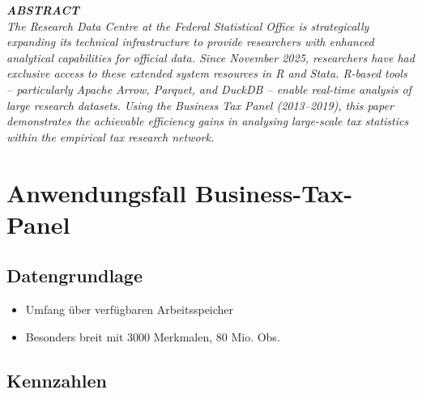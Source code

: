 \documentclass[
  german,
  10pt,
  twoside]{article}
\providecommand{\tightlist}{%
  \setlength{\itemsep}{0pt}\setlength{\parskip}{0pt}}
\renewcommand*\contentsname{Inhaltsverzeichnis}
\newcommand\contentsname{Inhaltsverzeichnis}
\begin{document}
\begin{titlepage}
\begin{minipage}[t]{11.8cm}
\vspace{0.3cm}

{\itshape\color{wistaDarkGray}\bfseries\MakeUppercase{Abstract}}\\[0.15cm]
\small\itshape
The Research Data Centre at the Federal Statistical Office is strategically expanding its technical infrastructure to provide researchers with enhanced analytical capabilities for official data. Since November 2025, researchers have had exclusive access to these extended system resources in R and Stata. R-based tools -- particularly Apache Arrow, Parquet, and DuckDB -- enable real-time analysis of large research datasets. Using the Business Tax Panel (2013--2019), this paper demonstrates the achievable efficiency gains in analysing large-scale tax statistics within the empirical tax research network.

\end{minipage}

\vfill

\vspace{0.5cm}
\noindent{}

\end{titlepage}

\pagestyle{fancy}

\renewcommand*\contentsname{Inhaltsverzeichnis}
{
\hypersetup{linkcolor=}
\setcounter{tocdepth}{3}
\tableofcontents
}

\section{Anwendungsfall
Business-Tax-Panel}\label{anwendungsfall-business-tax-panel}

\subsection{Datengrundlage}\label{datengrundlage}

\begin{itemize}
\tightlist
\item
  Umfang über verfügbaren Arbeitsspeicher
\item
  Besonders breit mit 3000 Merkmalen, 80 Mio. Obs.
\end{itemize}

\subsection{Kennzahlen}\label{kennzahlen}
\end{document}
